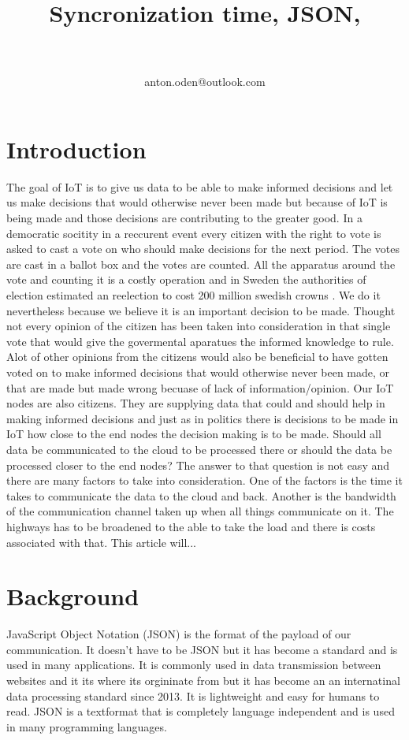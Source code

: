 \documentclass[article,a4paper]{IEEEtran}
\title{Syncronization time, JSON, }
\author{
\IEEEauthorblockN{Anton Odén}\\
\IEEEauthorblockA{Dept. of Maths and Computer Science\\Karlstad University\\
651 88 KARLSTAD, Sweden}\\
anton.oden@outlook.com
}
\begin{document}
\maketitle

\section{Introduction}
The goal of IoT is to give us data to be able to make informed decisions and let us make decisions that would otherwise never been made but because of IoT is being made and those decisions are contributing to the greater good. In a democratic socitity in a reccurent event every citizen with the right to vote is asked to cast a vote on who should make decisions for the next period. The votes are cast in a ballot box and the votes are counted. All the apparatus around the vote and counting it is a costly operation and in Sweden the authorities of election estimated an reelection to cost 200 million swedish crowns \cite{costElection}. We do it nevertheless because we believe it is an important decision to be made. Thought not every opinion of the citizen has been taken into consideration in that single vote that would give the govermental aparatues the informed knowledge to rule. Alot of other opinions from the citizens would also be beneficial to have gotten voted on to make informed decisions that would otherwise never been made, or that are made but made wrong becuase of lack of information/opinion. Our IoT nodes are also citizens. They are supplying data that could and should help in making informed decisions and just as in politics there is decisions to be made in IoT how close to the end nodes the decision making is to be made. Should all data be communicated to the cloud to be processed there or should the data be processed closer to the end nodes? The answer to that question is not easy and there are many factors to take into consideration. One of the factors is the time it takes to communicate the data to the cloud and back. Another is the bandwidth of the communication channel taken up when all things communicate on it. The highways has to be broadened to the able to take the load and there is costs associated with that. This article will...
\section{Background}  
JavaScript Object Notation (JSON) is the format of the payload of our communication. It doesn't have to be JSON but it has become a standard and is used in many applications. It is commonly used in data transmission between websites and it its where its orgininate from but it has become an an internatinal data processing standard since 2013. It is lightweight and easy for humans to read. JSON is a textformat that is completely language independent and is used in many programming languages.      
\printbibliography
\end{document}
